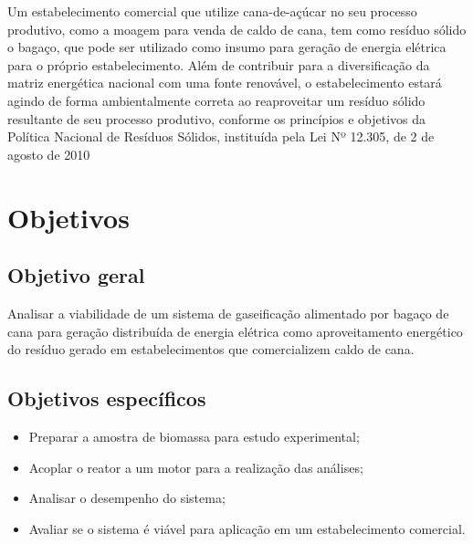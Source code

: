 Um estabelecimento comercial que utilize cana-de-açúcar no seu processo produtivo, como a moagem para venda de caldo de cana, tem como resíduo sólido o bagaço, que pode ser utilizado como insumo para geração de energia elétrica para o próprio estabelecimento.  Além de contribuir para a diversificação da matriz energética nacional com uma fonte renovável, o estabelecimento estará agindo de forma ambientalmente correta ao reaproveitar um resíduo sólido resultante de seu processo produtivo, conforme os princípios e objetivos da Política Nacional de Resíduos Sólidos, instituída pela Lei Nº 12.305, de 2 de agosto de 2010 %

\section{Objetivos}
\subsection{Objetivo geral}
Analisar a viabilidade de um sistema de gaseificação alimentado por bagaço de cana para geração distribuída de energia elétrica como aproveitamento energético do resíduo gerado em estabelecimentos que comercializem caldo de cana.

\subsection{Objetivos específicos}
\begin{itemize}

\item Preparar a amostra de biomassa para estudo experimental;

\item Acoplar o reator a um motor para a realização das análises;

\item Analisar o desempenho do sistema;

\item Avaliar se o sistema é viável para aplicação em um estabelecimento comercial.
\end{itemize}



